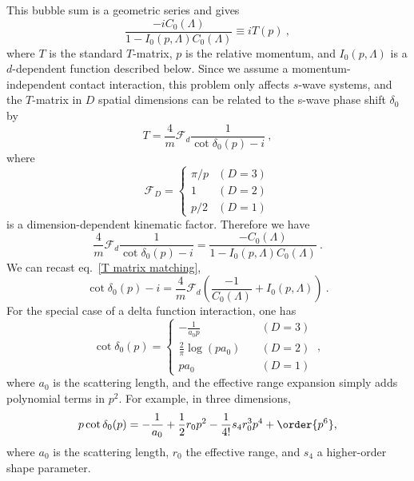 This bubble sum is a geometric series and gives\cite{Kaplan:1998we,Beane:2003da}
\begin{equation}\label{eq:scattering amplitude}
\frac{-iC_0(\Lambda)}{1-I_0(p,\Lambda)C_0(\Lambda)}\equiv iT(p)\ ,
\end{equation}
where $T$ is the standard $T$-matrix, $p$ is the relative momentum,  and $I_0(p,\Lambda)$ is a $d$-dependent function described below.  Since we assume a momentum-independent contact interaction, this problem only affects $s$-wave systems, and the $T$-matrix in $D$ spatial dimensions can be related to the s-wave phase shift $\delta_0$ by
\begin{equation}
T=\frac{4}{m}\mathcal{F}_d\frac{1}{\cot \delta_0(p)-i}\ ,
\end{equation}
where
\begin{equation}
\mathcal{F}_D=
\begin{cases}
\pi/p & (D=3)\\
1 & (D=2)\\
p/2 & (D=1)
\end{cases}
\end{equation}
is a dimension-dependent kinematic factor.
Therefore we have
\begin{equation}\label{eq:T matrix matching}
\boxed{
\frac{4}{m}\mathcal{F}_d\frac{1}{\cot \delta_0(p)-i}=\frac{-C_0(\Lambda)}{1-I_0(p,\Lambda)C_0(\Lambda)}
}\ .
\end{equation}
We can recast eq.~\eqref{T matrix matching},
\begin{equation}\label{eq:matching}
\cot \delta_0(p)-i=\frac{4}{m}\mathcal{F}_d\left(\frac{-1}{C_0(\Lambda)}+I_0(p,\Lambda)\right)\ .
\end{equation}
For the special case of a delta function interaction, one has \cite{busch1998}
\begin{equation}\label{eq:phase shifts}
\cot \delta_0(p) =
\begin{cases}
 - \frac{1}{a _ { 0 }p }&\quad (D=3)  \\
\frac { 2 } { \pi } \log \left( p a _ { 0 } \right) & \quad (D=2)\\
 p a _ { 0 } &\quad (D=1)
 \end{cases}\ ,
\end{equation}
where $a_0$ is the scattering length, and the effective range expansion simply adds polynomial terms in $p^2$.
For example, in three dimensions,
\begin{equation}
    \label{eq:ERE}
    p \cot \delta_0(p) = - \frac{1}{a_0} + \frac{1}{2} r_0 p^2 - \frac{1}{4!} s_4 r_0^3 p^4 + \order{p^6},
\end{equation}
where $a_0$ is the scattering length, $r_0$ the effective range, and $s_4$ a higher-order shape parameter.


